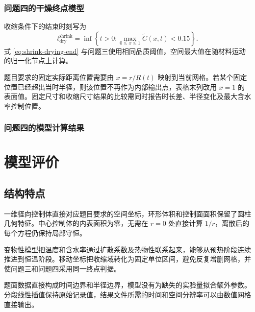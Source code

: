\documentclass[withoutpreface,bwprint]{cumcmthesis}
\begin{document}
\subsubsection{问题四的干燥终点模型}

收缩条件下的结束时刻写为
\begin{equation}
t_{\mathrm{dry}}^{\mathrm{shrink}}
=
\inf\left\{
t>0:
\max_{0\leq x\leq 1}\widetilde{C}(x,t)<0.15
\right\}.
\label{eq:shrink-drying-end}
\end{equation}
式 \ref{eq:shrink-drying-end} 与问题三使用相同品质阈值，空间最大值在随材料运动的归一化节点上计算。

题目要求的固定实际距离位置需要由 \(x=r/R(t)\) 映射到当前网格。若某个固定位置已经超出当时半径，则该位置不再作为内部输出点，表格末列改用 \(x=1\) 的表面值。固定尺寸和收缩尺寸结果的比较需同时报告时长差、半径变化及最大含水率控制位置。

\subsubsection{问题四的模型计算结果}


\section{模型评价}

\subsection{结构特点}

一维径向控制体直接对应题目要求的空间坐标，环形体积和控制面面积保留了圆柱几何特征。中心控制体的内表面积为零，无需在 \(r=0\) 处直接计算 \(1/r\)，离散后的每个方程仍保持局部守恒。

变物性模型把温度和含水率通过扩散系数及热物性联系起来，能够从预热阶段连续推进到恒温阶段。移动坐标把收缩域转化为固定单位区间，避免反复增删网格，并使问题三和问题四采用同一终点判据。

题面数据直接构成时间边界和半径边界，模型没有为缺失的实验量拟合额外参数。分段线性插值保持原始记录值，结果文件所需的时间和空间分辨率可以由数值网格直接输出。
\end{document}
